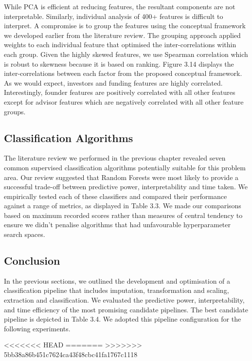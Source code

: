 \documentclass[../thesis/thesis.tex]{subfiles}
\begin{document}
While PCA is efficient at reducing features, the resultant components are not interpretable. Similarly, individual analysis of 400+ features is difficult to interpret. A compromise is to group the features using the conceptual framework we developed earlier from the literature review. The grouping approach applied weights to each individual feature that optimised the inter-correlations within each group. Given the highly skewed features, we use Spearman correlation which is robust to skewness because it is based on ranking. Figure 3.14 displays the inter-correlations between each factor from the proposed conceptual framework. As we would expect, investors and funding features are highly correlated. Interestingly, founder features are positively correlated with all other features except for advisor features which are negatively correlated with all other feature groups.

\subsection{Classification Algorithms}

The literature review we performed in the previous chapter revealed seven common supervised classification algorithms potentially suitable for this problem area. Our review suggested that Random Forests were most likely to provide a successful trade-off between predictive power, interpretability and time taken. We empirically tested each of these classifiers and compared their performance against a range of metrics, as displayed in Table 3.3. We made our comparisons based on maximum recorded scores rather than measures of central tendency to ensure we didn’t penalise algorithms that had unfavourable hyperparameter search spaces.

\subsection{Conclusion}

In the previous sections, we outlined the development and optimisation of a classification pipeline that includes imputation, transformation and scaling, extraction and classification. We evaluated the predictive power, interpretability, and time efficiency of the most promising candidate pipelines. The best candidate pipeline is depicted in Table 3.4. We adopted this pipeline configuration for the following experiments.

<<<<<<< HEAD
=======
>>>>>>> 5bb38a86b451c7624ca43f48cbc41fa1767c1118
\end{document}
